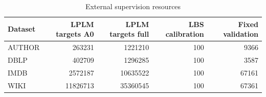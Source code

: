 \begin{table}[H]
\centering
\small
\setlength{\tabcolsep}{5pt}
\caption{External supervision resources}
\label{tab:A_external_ledger}
\begin{tabular}{@{}lrrrr@{}}
\toprule
Dataset & LPLM targets A0 & LPLM targets full & LBS calibration & Fixed validation \\
\midrule
AUTHOR & 263231 & 1221210 & 100 & 9366 \\
DBLP & 402709 & 1296285 & 100 & 3587 \\
IMDB & 2572187 & 10635522 & 100 & 67161 \\
WIKI & 11826713 & 35360545 & 100 & 67361 \\
\bottomrule
\end{tabular}
\end{table}
